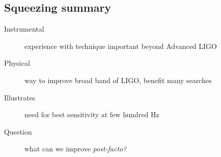 




\subsection{Squeezing summary}

\begin{description}
\item [{Instrumental}] experience with technique important beyond Advanced
LIGO
\item [{Physical}] way to improve broad band of LIGO, benefit many searches
\item [{Illustrates}] need for best sensitivity at few hundred Hz
\item [{Question}] what can we improve \emph{post-facto?}
\end{description}


%
%
%


